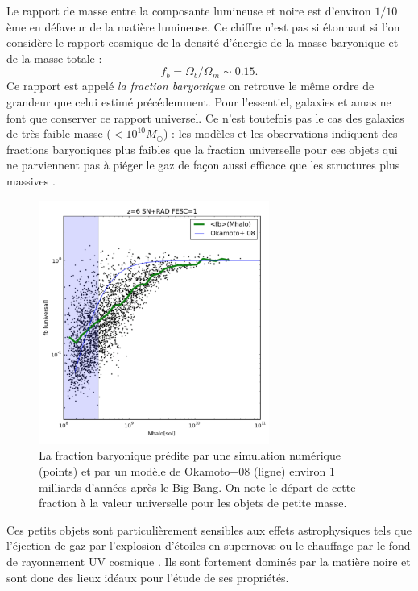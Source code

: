 Le rapport de masse entre la composante lumineuse et noire est d'environ $1/10$ème en défaveur de la matière lumineuse. Ce chiffre n'est pas si étonnant si l'on considère le rapport cosmique de la densité d'énergie de la masse baryonique et de la masse totale :
\begin{equation}
f_b=\Omega_b/\Omega_m\sim0.15.
\end{equation}
Ce rapport est appelé \textit{la fraction baryonique} on retrouve le même ordre de grandeur que celui estimé précédemment. Pour l'essentiel, galaxies et amas ne font que conserver ce rapport universel. Ce n'est toutefois pas le cas des galaxies de très faible masse ($<10^{10} M_\odot$) : les modèles et les observations indiquent des fractions baryoniques plus faibles que la fraction universelle pour ces objets qui ne parviennent pas à piéger le gaz de façon aussi efficace que les structures plus massives . 
\begin{figure}[htbp]
	\centering
		\includegraphics[height=8cm]{figs/fbar.png}
	\caption[La fraction baryonique prédite par une simulation numérique]{La fraction baryonique prédite par une simulation numérique (points) et par un modèle de Okamoto+08 (ligne) environ 1 milliards d'années après le Big-Bang. On note le départ de cette fraction à la valeur universelle pour les objets de petite masse.} 
	\label{f:fbar}
\end{figure}
Ces petits objets sont particulièrement sensibles aux effets astrophysiques tels que l'éjection de gaz par l'explosion d'étoiles en supernovæ ou le chauffage par le fond de rayonnement UV cosmique . Ils sont fortement dominés par la matière noire et sont donc des lieux idéaux pour l'étude de ses propriétés.

